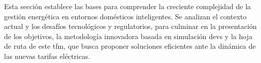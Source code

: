 \documentclass[11pt,a4paper]{book}
\begin{document}


%
%
%
%
%
Esta sección establece las bases para comprender la creciente complejidad de la gestión energética en entornos domésticos inteligentes. Se analizan el contexto actual y los desafíos tecnológicos y regulatorios, para culminar en la presentación de los objetivos, la metodología innovadora basada en simulación \gls{devs} y la hoja de ruta de este \gls{tfm}, que busca proponer soluciones eficientes ante la dinámica de las nuevas tarifas eléctricas.
\end{document}
